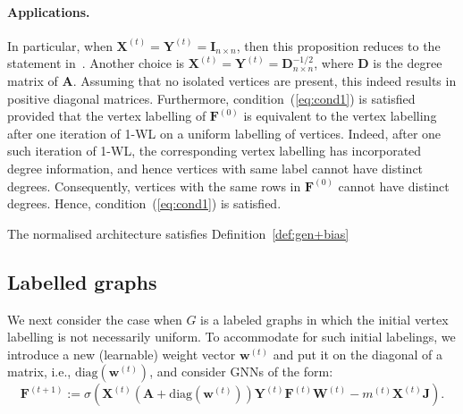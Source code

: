 \paragraph{Applications.}
In particular, when $\mathbf{X}^{(t)}=\mathbf{Y}^{(t)}=\mathbf{I}_{n\times n}$, then this proposition reduces to the statement in~\cite{grohewl}. Another choice is $\mathbf{X}^{(t)}=\mathbf{Y}^{(t)}=\mathbf{D}_{n\times n}^{-1/2}$, where
$\mathbf{D}$ is the degree matrix of $\mathbf{A}$. Assuming that no isolated vertices are present, this indeed results in positive diagonal matrices. Furthermore, condition~(\ref{eq:cond1}) is satisfied provided that the vertex labelling of  $\mathbf{F}^{(0)}$ is equivalent to the vertex labelling after one iteration of 1-WL on a uniform labelling of vertices.
Indeed, after one such iteration of 1-WL, the corresponding vertex labelling has incorporated degree information, and hence vertices with same label cannot have distinct degrees. Consequently, vertices with the same rows in $\mathbf{F}^{(0)}$ cannot have distinct degrees. Hence,  condition~(\ref{eq:cond1}) is satisfied.


\begin{corollary}\label{cor:normalised}
The normalised architecture satisfies Definition~\ref{def:gen+bias}
\end{corollary}

\subsection{Labelled graphs}\label{sec:labelled-graphs}
We next consider the case when $G$ is a labeled graphs in which the initial vertex labelling is not necessarily uniform.
To accommodate for such initial labelings, we introduce a new (learnable) weight vector $\mathbf{w}^{(t)}$ and put it on the diagonal of a matrix, i.e., $\text{diag}(\mathbf{w}^{(t)})$, and
consider GNNs of the form:
$$\mathbf{F}^{(t+1)}:=\sigma(\mathbf{X}^{(t)}(\mathbf{A}+\text{diag}(\mathbf{w}^{(t)}))\mathbf{Y}^{(t)}\mathbf{F}^{(t)}\mathbf{W}^{(t)} - m^{(t)}\mathbf{X}^{(t)}\mathbf{J}).$$

